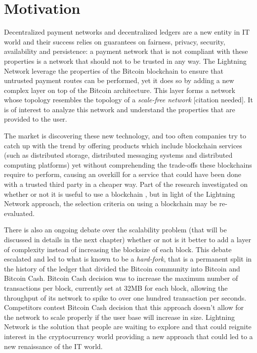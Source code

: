 	\section{Motivation}
		Decentralized payment networks and decentralized ledgers are a new entity in IT world and their success relies on guarantees on fairness, privacy, security, availability and persistence: a payment network that is not compliant with these properties is a network that should not to be trusted in any way. The Lightning Network leverage the properties of the Bitcoin blockchain to ensure that untrusted payment routes can be performed, yet it does so by adding a new complex layer on top of the Bitcoin architecture. This layer forms a network whose topology resembles the topology of a \textit{scale-free network} [citation needed]. It is of interest to analyze this network and understand the properties that are provided to the user. 
		
		The market is discovering these new technology, and too often companies try to catch up with the trend by offering products which include blockchain services (such as distributed storage, distributed messaging systems and distributed computing platforms) yet without comprehending the trade-offs these blockchains require to perform, causing an overkill for a service that could have been done with a trusted third party in a cheaper way. Part of the research investigated on whether or not it is useful to use a blockchain \cite{Wust2017}, but in light of the Lightning Network approach, the selection criteria on using a blockchain may be re-evaluated.
		
		There is also an ongoing debate over the scalability problem (that will be discussed in details in the next chapter) whether or not is it better to add a layer of complexity instead of increasing the blocksize of each block. This debate escalated and led to what is known to be a \textit{hard-fork}, that is a  permanent split in the history of the ledger that divided the Bitcoin community into Bitcoin and Bitcoin Cash. Bitcoin Cash decision was to increase the maximum number of transactions per block, currently set at 32MB for each block, allowing the throughput of its network to spike to over one hundred transaction per seconds. Competitors contest Bitcoin Cash decision that this approach doesn't allow for the network to scale properly if the user base will increase in size. Lightning Network is the solution that people are waiting to explore and that could reignite interest in the cryptocurrency world providing a new approach that could led to a new renaissance of the IT world.
		
